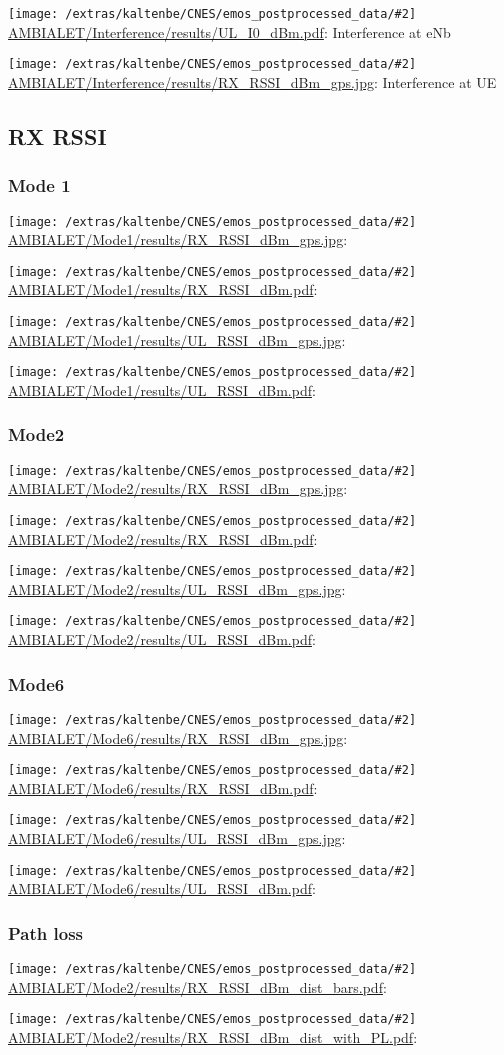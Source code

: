 \documentclass[a4paper,10pt]{article}
\newcommand{\printfile}[2][]{
 \begin{minipage}{8cm}
  \centering
  \texttt{[image: /extras/kaltenbe/CNES/emos\_postprocessed\_data/\#2]}
  \url{#2}: #1

 \end{minipage}
}
\begin{document}
\printfile[Interference at eNb]{AMBIALET/Interference/results/UL_I0_dBm.pdf}
\printfile[Interference at UE]{AMBIALET/Interference/results/RX_RSSI_dBm_gps.jpg}


\subsection{RX RSSI}


% 

\subsubsection{Mode 1}
\printfile{AMBIALET/Mode1/results/RX_RSSI_dBm_gps.jpg}
\printfile{AMBIALET/Mode1/results/RX_RSSI_dBm.pdf}

\printfile{AMBIALET/Mode1/results/UL_RSSI_dBm_gps.jpg}
\printfile{AMBIALET/Mode1/results/UL_RSSI_dBm.pdf}

\subsubsection{Mode2}

\printfile{AMBIALET/Mode2/results/RX_RSSI_dBm_gps.jpg}
\printfile{AMBIALET/Mode2/results/RX_RSSI_dBm.pdf}

\printfile{AMBIALET/Mode2/results/UL_RSSI_dBm_gps.jpg}
\printfile{AMBIALET/Mode2/results/UL_RSSI_dBm.pdf}

\subsubsection{Mode6}
\printfile{AMBIALET/Mode6/results/RX_RSSI_dBm_gps.jpg}
\printfile{AMBIALET/Mode6/results/RX_RSSI_dBm.pdf}

\printfile{AMBIALET/Mode6/results/UL_RSSI_dBm_gps.jpg}
\printfile{AMBIALET/Mode6/results/UL_RSSI_dBm.pdf}

\subsubsection{Path loss}

\printfile{AMBIALET/Mode2/results/RX_RSSI_dBm_dist_bars.pdf}
\printfile{AMBIALET/Mode2/results/RX_RSSI_dBm_dist_with_PL.pdf}
\end{document}
